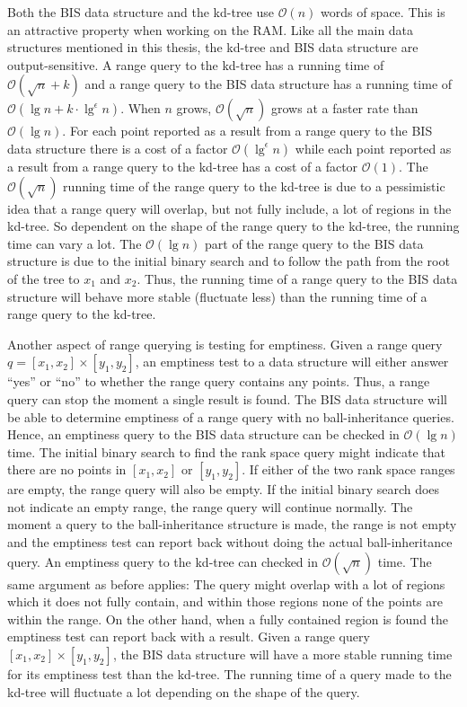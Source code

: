 Both the BIS data structure and the kd-tree use $\mathcal{O}(n)$ words of space. This is an attractive property when working on the RAM. Like all the main data structures mentioned in this thesis, the kd-tree and BIS data structure are output-sensitive. A range query to the kd-tree has a running time of $\mathcal{O}(\sqrt{n}+k)$ and a range query to the BIS data structure has a running time of $\mathcal{O}(\lg n + k\cdot\lg^\epsilon n)$. When $n$ grows, $\mathcal{O}(\sqrt{n})$ grows at a faster rate than $\mathcal{O}(\lg n)$. For each point reported as a result from a range query to the BIS data structure there is a cost of a factor $\mathcal{O}(\lg^\epsilon n)$ while each point reported as a result from a range query to the kd-tree has a cost of a factor $\mathcal{O}(1)$. The $\mathcal{O}(\sqrt{n})$ running time of the range query to the kd-tree is due to a pessimistic idea that a range query will overlap, but not fully include, a lot of regions in the kd-tree. So dependent on the shape of the range query to the kd-tree, the running time can vary a lot. The $\mathcal{O}(\lg n)$ part of the range query to the BIS data structure is due to the initial binary search and to follow the path from the root of the tree to $x_1$ and $x_2$. Thus, the running time of a range query to the BIS data structure will behave more stable (fluctuate less) than the running time of a range query to the kd-tree. 


Another aspect of range querying is testing for emptiness. Given a range query $q = [x_1, x_2] \times [y_1, y_2]$, an emptiness test to a data structure will either answer ``yes'' or ``no'' to whether the range query contains any points. Thus, a range query can stop the moment a single result is found. The BIS data structure will be able to determine emptiness of a range query with no ball-inheritance queries. Hence, an emptiness query to the BIS data structure can be checked in $\mathcal{O}(\lg n)$ time. The initial binary search to find the rank space query might indicate that there are no points in $[x_1, x_2]$ or $[y_1, y_2]$. If either of the two rank space ranges are empty, the range query will also be empty. If the initial binary search does not indicate an empty range, the range query will continue normally. The moment a query to the ball-inheritance structure is made, the range is not empty and the emptiness test can report back without doing the actual ball-inheritance query. An emptiness query to the kd-tree can checked in $\mathcal{O}(\sqrt{n})$ time. The same argument as before applies: The query might overlap with a lot of regions which it does not fully contain, and within those regions none of the points are within the range. On the other hand, when a fully contained region is found the emptiness test can report back with a result. Given a range query $[x_1, x_2] \times [y_1, y_2]$, the BIS data structure will have a more stable running time for its emptiness test than the kd-tree. The running time of a query made to the kd-tree will fluctuate a lot depending on the shape of the query.

